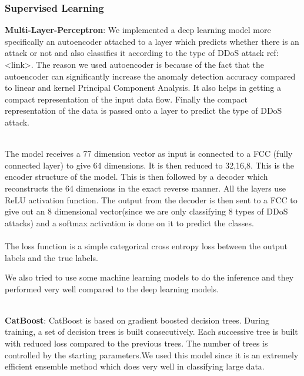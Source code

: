 \documentclass[10pt,twocolumn,letterpaper]{article}
\providecommand{\tightlist}{%
  \setlength{\itemsep}{0pt}\setlength{\parskip}{0pt}}
\begin{document}

\subsubsection{Supervised Learning}

\begin{itemsize}
\tightlist
    \item \textbf{Multi-Layer-Perceptron}:
    We implemented a deep learning model more specifically an autoencoder attached to a layer which predicts whether there is an attack or not and also classifies it according to the type of DDoS attack {ref: <link>}. The reason we used autoencoder is because of the fact that the autoencoder can significantly increase the anomaly detection accuracy compared to linear and kernel Principal Component Analysis. It also helps in getting a compact representation of the input data flow. Finally the compact representation of the data is passed onto a  layer to predict the type of DDoS attack.\\\\
    \par The model receives a 77 dimension vector as input is connected to a FCC (fully connected layer) to give 64 dimensions. It is then reduced to 32,16,8. This is the encoder structure of the model. This is then followed by a decoder which reconstructs the 64 dimensions in the exact reverse manner. All the layers use ReLU  activation function. The output from the decoder is then sent to a FCC to give out an 8 dimensional vector(since we are only classifying 8 types of DDoS attacks) and a softmax activation is done on it to predict the classes.\\\\
    The loss function is a simple categorical cross entropy loss between the output labels and the true labels.\\
    \par We also tried to use some machine learning models to do the inference and they performed very well compared to the deep learning models.\\\\
    \item \textbf{CatBoost}:
    CatBoost is based on gradient boosted decision trees. During training, a set of decision trees is built consecutively. Each successive tree is built with reduced loss compared to the previous trees. The number of trees is controlled by the starting parameters.We used this model since it is an extremely efficient ensemble method which does very well in classifying large data.\\

\end{itemsize}
\end{document}
